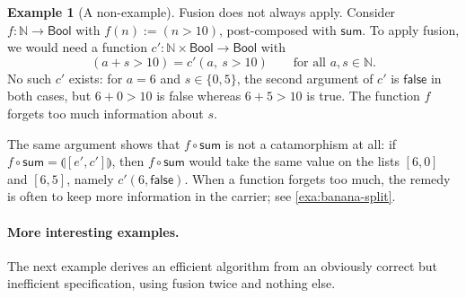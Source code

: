 \documentclass[a4paper,11pt, oneside,titlepage=false]{scrbook}
\theoremstyle{plain}
\theoremstyle{definition}
\newtheorem{exa}[thm]{Example}
\newcommand{\catam}[1]{\llparenthesis #1 \rrparenthesis}
\newcommand{\NN}{\ensuremath{\mathbb{N}}}
\newcommand{\Bool}{\ensuremath{\mathsf{Bool}}}
\begin{document}
\begin{exa}[A non-example]\label{exa:fusion-nonexample}
  Fusion does not always apply.
  Consider $f : \NN \to \Bool$ with $f(n) := (n > 10)$, post-composed with $\mathsf{sum}$.
  To apply fusion, we would need a function $c' : \NN \times \Bool \to \Bool$ with
  \[ (a + s > 10) = c'(a,\ s > 10) \qquad \text{for all } a, s \in \NN. \]
  No such $c'$ exists: for $a = 6$ and $s \in \{0, 5\}$, the second argument of $c'$ is $\mathsf{false}$ in both cases, but $6 + 0 > 10$ is false whereas $6 + 5 > 10$ is true.
  The function $f$ forgets too much information about $s$.

  The same argument shows that $f \circ \mathsf{sum}$ is not a catamorphism at all:
  if $f \circ \mathsf{sum} = \catam{[e', c']}$, then $f \circ \mathsf{sum}$ would take the same value on the lists $[6, 0]$ and $[6, 5]$, namely $c'(6, \mathsf{false})$.
  When a function forgets too much, the remedy is often to keep more information in the carrier; see \cref{exa:banana-split}.
\end{exa}

\paragraph{More interesting examples.}
The next example derives an efficient algorithm from an obviously correct but inefficient specification, using fusion twice and nothing else.
\end{document}

